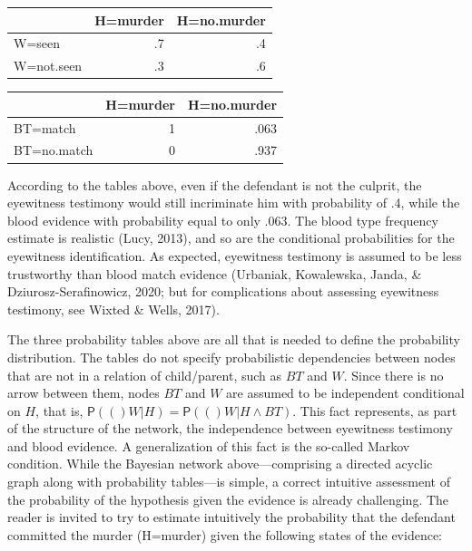 \documentclass[11pt,dvipsnames,enabledeprecatedfontcommands]{scrartcl}
\newcommand{\pr}[1]{\mathsf{P}(#1)}
\begin{document}
\begin{table}[H]
\centering
\begin{tabular}{lrr}
\toprule
  & H=murder & H=no.murder\\
\midrule
W=seen & .7 & .4\\
W=not.seen & .3 & .6\\
\bottomrule
\end{tabular}
\end{table}

\begin{table}[H]
\centering
\begin{tabular}{lrr}
\toprule
  & H=murder & H=no.murder\\
\midrule
BT=match & 1 & .063\\
BT=no.match & 0 & .937\\
\bottomrule
\end{tabular}
\end{table}

\noindent
According to the tables above, even if the defendant is not the culprit,
the eyewitness testimony would still incriminate him with probability of
.4, while the blood evidence with probability equal to only .063. The
blood type frequency estimate is realistic (Lucy, 2013), and so are the
conditional probabilities for the eyewitness identification. As
expected, eyewitness testimony is assumed to be less trustworthy than
blood match evidence (Urbaniak, Kowalewska, Janda, \&
Dziurosz-Serafinowicz, 2020; but for complications about assessing
eyewitness testimony, see Wixted \& Wells, 2017).

The three probability tables above are all that is needed to define the
probability distribution. The tables do not specify probabilistic
dependencies between nodes that are not in a relation of child/parent,
such as \(BT\) and \(W\). Since there is no arrow between them, nodes
\(BT\) and \(W\) are assumed to be independent conditional on \(H\),
that is, \(\pr(W \vert H)=\pr(W \vert H \wedge BT)\). This fact
represents, as part of the structure of the network, the independence
between eyewitness testimony and blood evidence. A generalization of
this fact is the so-called Markov condition. While the Bayesian network
above---comprising a directed acyclic graph along with probability
tables---is simple, a correct intuitive assessment of the probability of
the hypothesis given the evidence is already challenging. The reader is
invited to try to estimate intuitively the probability that the
defendant committed the murder (H=murder) given the following states of
the evidence:
\end{document}
